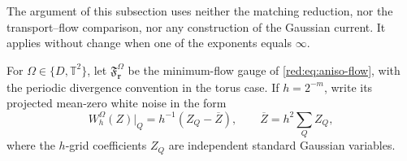 \documentclass[11pt]{article}
\theoremstyle{definition}
\theoremstyle{remark}
\numberwithin{equation}{section}
\newcommand{\T}{\mathbb T}
\begin{document}
The argument of this subsection uses neither the matching reduction,
nor the transport--flow comparison, nor any construction of the
Gaussian current. It applies without change when one of the exponents
equals $\infty$.

For $\Omega\in\{D,\T^2\}$, let $\mathfrak F_{\boldsymbol r}^{\Omega}$
be the minimum-flow gauge of \eqref{red:eq:aniso-flow}, with the
periodic divergence convention in the torus case. If $h=2^{-m}$,
write its projected mean-zero white noise in the form
\begin{equation}\label{red:eq:gaussian-coefficients}
 W_h^{\Omega}(Z)|_Q=h^{-1}(Z_Q-\overline Z),
 \qquad \overline Z=h^2\sum_Q Z_Q,
\end{equation}
where the $h$-grid coefficients $Z_Q$ are independent standard
Gaussian variables.
\end{document}
